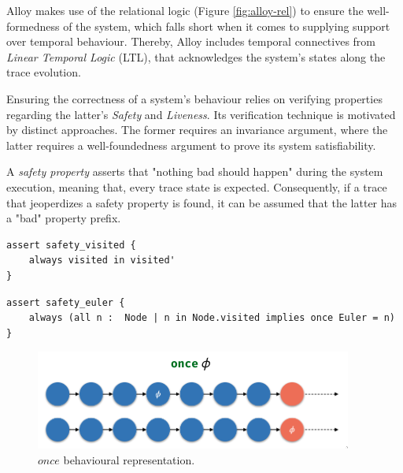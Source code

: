 Alloy makes use of the relational logic (Figure \ref{fig:alloy-rel}) to ensure the well-formedness of the system, which falls short when it comes to supplying support over temporal behaviour. Thereby, Alloy includes temporal connectives from \textit{Linear Temporal Logic} (LTL), that acknowledges the system's states along the trace evolution. \cite{lwspecification, alloy-6, 9341085}

Ensuring the correctness of a system's behaviour relies on verifying properties regarding the latter's \textit{Safety} and \textit{Liveness}. Its verification technique is motivated by distinct approaches. \cite{kindler1994safety} The former requires an invariance argument, where the latter requires a well-foundedness argument to prove its system satisfiability. \cite{alpern1987recognizing}

A \textit{safety property} asserts that "nothing bad should happen" during the system execution, meaning that, every trace state is expected. Consequently, if a trace that jeoperdizes a safety property is found, it can be assumed that the latter has a "bad" property prefix. 

\begin{lstlisting}[title={\textit{Safety Property}: The relation visited can only evolve through time.}, otherkeywords = {always, assert, module, set, fact, iden, no, in, \=, \*, \+, \~, \-\>, \&, '}, floatplacement=H]
assert safety_visited {
    always visited in visited'
} 
\end{lstlisting}

\begin{lstlisting}[title={\textit{Safety Property}: If a node is visited, then once \textit{Euler} was 'inside' it.}, otherkeywords = {always, assert, module, set, fact, iden, no, in, \=, \*, \+, \~, \-\>, \&, all, \:, \., implies, once}, floatplacement=H]
assert safety_euler {
    always (all n :  Node | n in Node.visited implies once Euler = n)
} 
\end{lstlisting}

\begin{figure}[H]
    \centering
    \includegraphics[width=0.6\linewidth]{images/alloy_once.png}
    \caption{$once$ behavioural representation.}
    \label{fig:alloy-once}
\end{figure}

